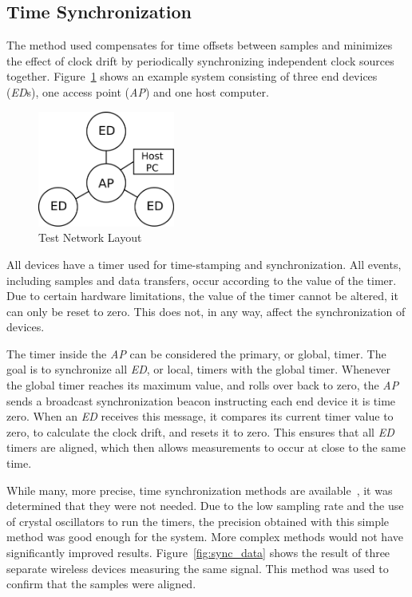 \documentclass{article}
\begin{document}
\subsection{Time Synchronization}
The method used compensates for time offsets between samples and minimizes the effect of clock drift by periodically synchronizing independent clock sources together. Figure~\ref{fig:network_layout} shows an example system consisting of three end devices (\emph{ED}s), one access point (\emph{AP}) and one host computer. 
\begin{figure}[htb]
\begin{center}
\includegraphics[width=0.4\textwidth]{figures/network-map-test2.pdf}
\end{center}
\caption{Test Network Layout}
\label{fig:network_layout}
\end{figure}
All devices have a timer used for time-stamping and synchronization. All events, including samples and data transfers, occur according to the value of the timer. Due to certain hardware limitations, the value of the timer cannot be altered, it can only be reset to zero. This does not, in any way, affect the synchronization of devices.

The timer inside the \emph{AP} can be considered the primary, or global, timer. The goal is to synchronize all \emph{ED}, or local, timers with the global timer. Whenever the global timer reaches its maximum value, and rolls over back to zero, the \emph{AP} sends a broadcast synchronization beacon instructing each end device it is time zero. When an \emph{ED} receives this message, it compares its current timer value to zero, to calculate the clock drift, and resets it to zero. This ensures that all \emph{ED} timers are aligned, which then allows measurements to occur at close to the same time.

While many, more precise, time synchronization methods are available~\cite{synchronization:FTSP}, it was determined that they were not needed. Due to the low sampling rate and the use of crystal oscillators to run the timers, the precision obtained with this simple method was good enough for the system. More complex methods would not have significantly improved results. Figure~\ref{fig:sync_data} shows the result of three separate wireless devices measuring the same signal. This method was used to confirm that the samples were aligned.
\end{document}
